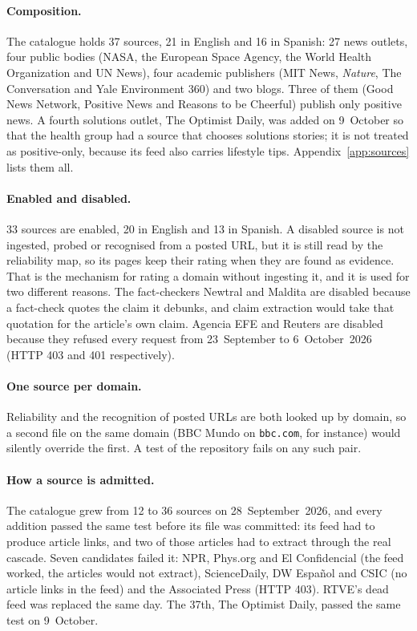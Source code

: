 \paragraph{Composition.} The catalogue holds 37 sources, 21 in English
and 16 in Spanish: 27 news outlets, four public bodies (NASA, the
European Space Agency, the World Health Organization and UN News), four
academic publishers (MIT News, \textit{Nature}, The Conversation and
Yale Environment 360) and two blogs. Three of them (Good News Network,
Positive News and Reasons to be Cheerful) publish only positive news. A
fourth solutions outlet, The Optimist Daily, was added on 9~October so
that the health group had a source that chooses solutions stories; it
is not treated as positive-only, because its feed also carries
lifestyle tips. Appendix~\ref{app:sources} lists them all.

\paragraph{Enabled and disabled.} 33 sources are enabled, 20 in English
and 13 in Spanish. A disabled source is not ingested, probed or
recognised from a posted URL, but it is still read by the reliability
map, so its pages keep their rating when they are found as evidence.
That is the mechanism for rating a domain without ingesting it, and it
is used for two different reasons. The fact-checkers Newtral and
Maldita are disabled because a fact-check quotes the claim it
debunks, and claim extraction would take that quotation for the
article's own claim. Agencia EFE and Reuters are disabled because they
refused every request from 23~September to 6~October~2026 (HTTP 403
and 401 respectively).

\paragraph{One source per domain.} Reliability and the recognition of
posted URLs are both looked up by domain, so a second file on the same
domain (BBC Mundo on \texttt{bbc.com}, for instance) would silently
override the first. A test of the repository fails on any such pair.

\paragraph{How a source is admitted.} The catalogue grew from 12 to 36
sources on 28~September~2026, and every addition passed the same test
before its file was committed: its feed had to produce article links,
and two of those articles had to extract through the real cascade.
Seven candidates failed it: NPR, Phys.org and El Confidencial (the
feed worked, the articles would not extract), ScienceDaily, DW Español
and CSIC (no article links in the feed) and the Associated Press
(HTTP 403). RTVE's dead feed was replaced the same day. The 37th,
The Optimist Daily, passed the same test on 9~October.
